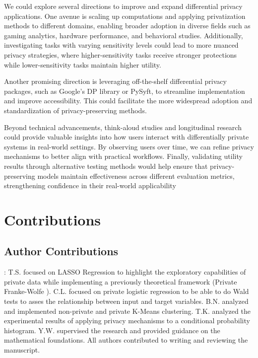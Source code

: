 \documentclass[12pt,letterpaper]{article}
\begin{document}
We could explore several directions to improve and expand differential privacy applications. One avenue is scaling up computations and applying privatization methods to different domains, enabling broader adoption in diverse fields such as gaming analytics, hardware performance, and behavioral studies. Additionally, investigating tasks with varying sensitivity levels could lead to more nuanced privacy strategies, where higher-sensitivity tasks receive stronger protections while lower-sensitivity tasks maintain higher utility.

Another promising direction is leveraging off-the-shelf differential privacy packages, such as Google's DP library or PySyft, to streamline implementation and improve accessibility. This could facilitate the more widespread adoption and standardization of privacy-preserving methods.

Beyond technical advancements, think-aloud studies and longitudinal research could provide valuable insights into how users interact with differentially private systems in real-world settings. By observing users over time, we can refine privacy mechanisms to better align with practical workflows. Finally, validating utility results through alternative testing methods would help ensure that privacy-preserving models maintain effectiveness across different evaluation metrics, strengthening confidence in their real-world applicability



\section{Contributions}

\subsection{Author Contributions}:
T.S. focused on LASSO Regression to highlight the exploratory capabilities of private data while implementing a previously theoretical framework (Private Franke-Wolfe \cite{NIPS2015_52d080a3}). C.L. focused on private logistic regression to be able to do Wald tests to asses the relationship between input and target variables. B.N. analyzed and implemented non-private and private K-Means clustering. T.K. analyzed the experimental results of applying privacy mechanisms to a conditional probability histogram. Y.W. supervised the research and provided guidance on the mathematical foundations. All authors contributed to writing and reviewing the manuscript.
\end{document}
